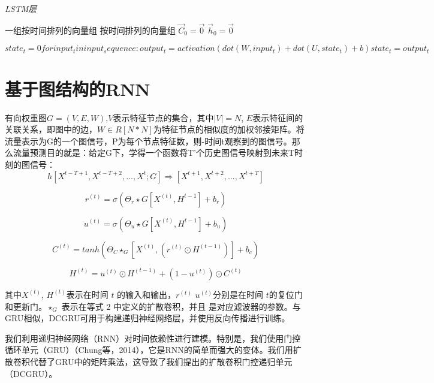 \begin{algorithm}[!h]
    \caption{\emph{LSTM层}}
    \begin{algorithmic}[1]
        \Require 一组按时间排列的向量组
        \Ensure 按时间排列的向量组
        \State $\vec C_0 = \vec 0$
        \State $\vec h_0 = \vec 0$


        \EndFor
    \end{algorithmic}
\end{algorithm}
  
$  state_t = 0
  for input_t in input_sequence:
    output_t = activation(dot(W, input_t) + dot(U, state_t) + b)
    state_t = output_t$
\section{基于图结构的RNN}
有向权重图$G=(V,E,W)$,$V$表示特征节点的集合，其中$|V|=N$, $E$表示特征间的关联关系，即图中的边，$W∈R[N*N]$为特征节点的相似度的加权邻接矩阵。将流量表示为G的一个图信号，P为每个节点特征数，则-时间t观察到的图信号。那么流量预测目的就是：给定G下，学得一个函数将T'个历史图信号映射到未来T时刻的图信号：
\begin{equation}
    h[X^{t-T+1}, X^{t-T+2},...,X^{t}; G] \Rightarrow [X^{t+1}, X^{t+2}, ..., X^{t+T}]
\end{equation}

\begin{equation}
    r^{(t)} = \sigma(\Theta_r\star G[X^{(t)},H^{t-1}] + b_r)
\end{equation}

\begin{equation}
    u^{(t)} = \sigma(\Theta_u\star G[X^{(t)},H^{t-1}] + b_u)
\end{equation}

\begin{equation}
    C^{(t)} = tanh(\Theta_C\star_G[X^{(t)},(r^{(t)}\odot H^{(t-1)})] + b_c)
\end{equation}

\begin{equation}
    H^{(t)} = u^{(t)}\odot H^{(t-1)} + (1 - u^{(t)}) \odot C^{(t)}
\end{equation}

其中$X^{(t)}$, $H^{(t)}$表示在时间 $t$ 的输入和输出，$r^{(t)}$ $u^{(t)}$分别是在时间 $t$的复位门和更新门。$\star_G$  表示在等式 2 中定义的扩散卷积，并且  是对应滤波器的参数。与GRU相似，DCGRU可用于构建递归神经网络层，并使用反向传播进行训练。

我们利用递归神经网络（RNN）对时间依赖性进行建模。特别是，我们使用门控循环单元（GRU）（Chung等，2014），它是RNN的简单而强大的变体。我们用扩散卷积代替了GRU中的矩阵乘法，这导致了我们提出的扩散卷积门控递归单元（DCGRU）。

